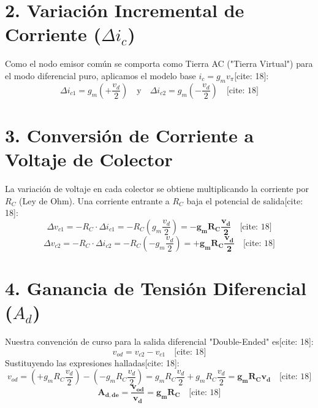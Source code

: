 \documentclass[11pt, a4paper]{article}
\begin{document}
\section*{2. Variación Incremental de Corriente ($\Delta i_c$)}
Como el nodo emisor común se comporta como Tierra AC ("Tierra Virtual") para el modo diferencial puro, aplicamos el modelo base $i_c = g_m v_\pi$[cite: 18]:
\begin{equation*}
    \Delta i_{c1} = g_m \left(+\frac{v_d}{2}\right) \quad \text{y} \quad \Delta i_{c2} = g_m \left(-\frac{v_d}{2}\right) \quad \text{[cite: 18]}
\end{equation*}

\section*{3. Conversión de Corriente a Voltaje de Colector}
La variación de voltaje en cada colector se obtiene multiplicando la corriente por $R_C$ (Ley de Ohm). Una corriente entrante a $R_C$ baja el potencial de salida[cite: 18]:
\begin{equation*}
    \Delta v_{c1} = -R_C \cdot \Delta i_{c1} = -R_C \left( g_m \frac{v_d}{2} \right) = \mathbf{-g_m R_C \frac{v_d}{2}} \quad \text{[cite: 18]}
\end{equation*}
\begin{equation*}
    \Delta v_{c2} = -R_C \cdot \Delta i_{c2} = -R_C \left( -g_m \frac{v_d}{2} \right) = \mathbf{+g_m R_C \frac{v_d}{2}} \quad \text{[cite: 18]}
\end{equation*}

\section*{4. Ganancia de Tensión Diferencial ($A_d$)}
Nuestra convención de curso para la salida diferencial "Double-Ended" es[cite: 18]:
\begin{equation*}
    v_{od} = v_{c2} - v_{c1} \quad \text{[cite: 18]}
\end{equation*}
Sustituyendo las expresiones halladas[cite: 18]:
\begin{equation*}
    v_{od} = \left(+g_m R_C \frac{v_d}{2}\right) - \left(-g_m R_C \frac{v_d}{2}\right) = g_m R_C \frac{v_d}{2} + g_m R_C \frac{v_d}{2} = \mathbf{g_m R_C v_d} \quad \text{[cite: 18]}
\end{equation*}
\begin{equation*}
    \boxed{ \mathbf{A_{d,de} = \frac{v_{od}}{v_d} = g_m R_C} } \quad \text{[cite: 18]}
\end{equation*}
\end{document}
